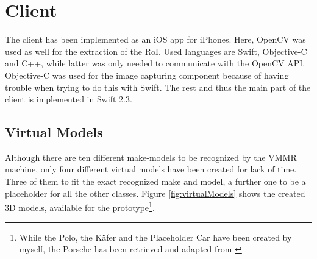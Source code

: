\section{Client}\label{sec:clientImpl}
The client has been implemented as an iOS app for iPhones. Here, OpenCV was used as well for the extraction of the RoI. Used languages are Swift, Objective-C and C++, while latter was only needed to communicate with the OpenCV API. Objective-C was used for the image capturing component because of having trouble when trying to do this with Swift. The rest and thus the main part of the client is implemented in Swift 2.3.

\subsection{Virtual Models}
Although there are ten different make-models to be recognized by the VMMR machine, only four different virtual models have been created for lack of time. Three of them to fit the exact recognized make and model, a further one to be a placeholder for all the other classes. Figure \ref{fig:virtualModels} shows the created 3D models, available for the prototype\footnote{While the Polo, the K\"afer and the Placeholder Car have been created by myself, the Porsche has been retrieved and adapted from \citep{porscheModel}}.

